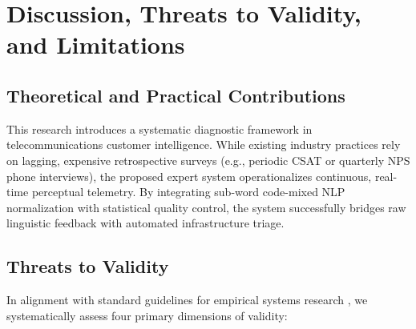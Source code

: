 \documentclass[review,12pt,authoryear]{elsarticle}
\begin{document}
\section{Discussion, Threats to Validity, and Limitations}
\label{sec:limitations}

\subsection{Theoretical and Practical Contributions}
This research introduces a systematic diagnostic framework in telecommunications customer intelligence. While existing industry practices rely on lagging, expensive retrospective surveys (e.g., periodic CSAT or quarterly NPS phone interviews), the proposed expert system operationalizes continuous, real-time perceptual telemetry. By integrating sub-word code-mixed NLP normalization with statistical quality control, the system successfully bridges raw linguistic feedback with automated infrastructure triage.

\subsection{Threats to Validity}
In alignment with standard guidelines for empirical systems research \citep{wohlin2012experimentation}, we systematically assess four primary dimensions of validity:
\end{document}
